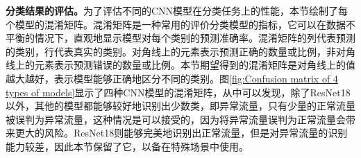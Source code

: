\textbf{分类结果的评估。}\label{subsection:Classification_result_evaluation}为了评估不同的CNN模型在分类任务上的性能，本节绘制了每个模型的混淆矩阵。混淆矩阵是一种常用的评价分类模型的指标，它可以在数据不平衡的情况下，直观地显示模型对每个类别的预测准确率。混淆矩阵的列代表预测的类别，行代表真实的类别。对角线上的元素表示预测正确的数量或比例，非对角线上的元素表示预测错误的数量或比例。本节期望得到的混淆矩阵是对角线上的值越大越好，表示模型能够正确地区分不同的类别。图\ref{fig:Confusion matrix of 4 types of models}显示了四种CNN模型的混淆矩阵，从中可以发现，除了ResNet18以外，其他的模型都能够较好地识别出少数类，即异常流量，只有少量的正常流量被误判为异常流量，这种情况是可以接受的，因为将异常流量误判为正常流量会带来更大的风险。ResNet18则能够完美地识别出正常流量，但是对异常流量的识别能力较差，因此本节保留了它，以备在特殊场景中使用。

